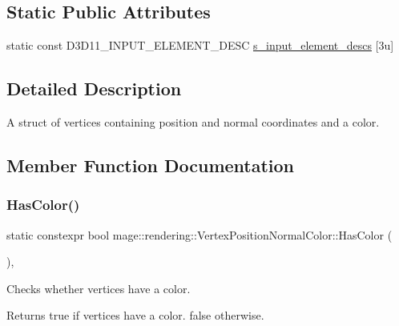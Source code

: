 \subsection*{Static Public Attributes}
\begin{DoxyCompactItemize}
\item 
static const D3\+D11\+\_\+\+I\+N\+P\+U\+T\+\_\+\+E\+L\+E\+M\+E\+N\+T\+\_\+\+D\+E\+SC \mbox{\hyperlink{structmage_1_1rendering_1_1_vertex_position_normal_color_a2b8768994f2e23a278f88a63b7e0364f}{s\+\_\+input\+\_\+element\+\_\+descs}} \mbox{[}3u\mbox{]}
\end{DoxyCompactItemize}


\subsection{Detailed Description}
A struct of vertices containing position and normal coordinates and a color. 

\subsection{Member Function Documentation}
\mbox{\label{structmage_1_1rendering_1_1_vertex_position_normal_color_ae1d38a1d2e3f546c475849ec360f5317}} 
\subsubsection{\texorpdfstring{Has\+Color()}{HasColor()}}
{\footnotesize\ttfamily static constexpr bool mage\+::rendering\+::\+Vertex\+Position\+Normal\+Color\+::\+Has\+Color (\begin{DoxyParamCaption}{ }\end{DoxyParamCaption})\hspace{0.3cm}{\ttfamily [static]}, {\ttfamily [noexcept]}}

Checks whether vertices have a color.

\begin{DoxyReturn}{Returns}
{\ttfamily true} if vertices have a color. {\ttfamily false} otherwise. 
\end{DoxyReturn}
\mbox{\label{structmage_1_1rendering_1_1_vertex_position_normal_color_a663883aaff79837d1abb1c5cb54d2340}} 
